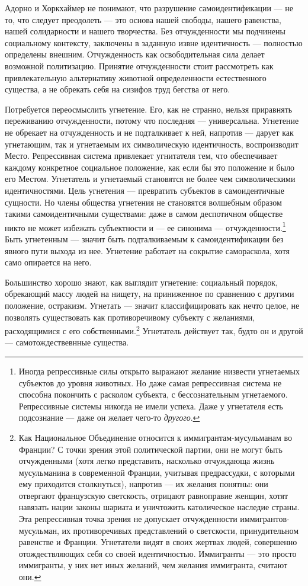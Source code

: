 \documentclass[12pt]{book}
\begin{document}
Адорно и Хоркхаймер не понимают, что разрушение самоидентификации --- не то, что следует преодолеть --- это основа нашей свободы, нашего равенства, нашей солидарности и нашего творчества. Без отчужденности мы подчинены социальному контексту, заключены в заданную извне идентичность --- полностью определены внешним. Отчужденность как освободительная сила делает возможной политизацию. Принятие отчужденности стоит рассмотреть как привлекательную альтернативу животной определенности естественного существа, а не обрекать себя на сизифов труд бегства от него.

Потребуется переосмыслить угнетение. Его, как не странно, нельзя приравнять переживанию отчужденности, потому что последняя --- универсальна. Угнетение не обрекает на отчужденность и не подталкивает к ней, напротив --- дарует как угнетающим, так и угнетаемым их символическую идентичность, воспроизводит Место. Репрессивная система привлекает угнитателя тем, что обеспечивает каждому конкретное социальное положение, как если бы это положение и было его Местом. Угнетатель и угнетаемый становятся не более чем символическими идентичностями. Цель угнетения --- превратить субъектов в самоидентичные сущности. Но члены общества угнетения не становятся волшебным образом такими самоидентичными существами: даже в самом деспотичном обществе никто не может избежать субъектности и --- ее синонима --- отчужденности.\footnote{Иногда репрессивные силы открыто выражают желание низвести угнетаемых субъектов до уровня животных. Но даже самая репрессивная система не способна покончить с расколом субъекта, с бессознательным угнетаемого. Репрессивные системы никогда не имели успеха. Даже у угнетателя есть подсознание --- даже он желает чего-то \textit{другого}.} Быть угнетенным --- значит быть подталкиваемым к самоидентификации без явного пути выхода из нее. Угнетение работает на сокрытие самораскола, хотя само опирается на него.

Большинство хорошо знают, как выглядит угнетение: социальный порядок, обрекающий массу людей на нищету, на приниженное по сравнению с другими положение, остракизм. Угнетать --- значит классифицировать как нечто целое, не позволять существовать как противоречивому субъекту с желаниями, расходящимися с его собственными.\footnote{Как Национальное Объединение относится к иммигрантам-мусульманам во Франции? С точки зрения этой политической партии, они не могут быть отчужденными (хотя легко представить, насколько отчуждающа жизнь мусульманина в современной Франции, учитывая предрассудки, с которыми ему приходится столкнуться), напротив --- их желания понятны: они отвергают французскую светскость, отрицают равноправие женщин, хотят навязать нации законы шариата и уничтожить католическое наследие страны. Эта репрессивная точка зрения не допускает отчужденности иммигрантов-мусульман, их противоречивых представлений о светскости, принудительном равенстве и Франции. Угнетатели видят в своих жертвах людей, совершенно отождествляющих себя со своей идентичностью. Иммигранты --- это просто иммигранты, у них нет иных желаний, чем желания иммигранта, считают они.} Угнетатель действует так, будто он и другой --- самотождествевнные существа.
\end{document}
